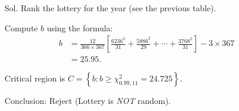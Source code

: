 \begin{frame}[fragile]
\begin{itemize}
	\item[Sol.] Rank the lottery for the year (see the previous table).
	\bigskip
	\item[] Compute $b$ using the formula:
	 \begin{align*}
		b & =\frac{12}{366\times 367}\left[\frac{6236^2}{31}+ \frac{5886^2}{29} + \cdots + \frac{3768^2}{31}\right] -3 \times 367\\
      & = 25.95.
	\end{align*}
	\item[] Critical region is $C=\left\{b: b\ge \chi_{0.99,11}^2 = 24.725\right\}$.
	\bigskip
	\item[] Conclusion: Reject (Lottery is {\it NOT} random). \myQED
\end{itemize}
\end{frame}
